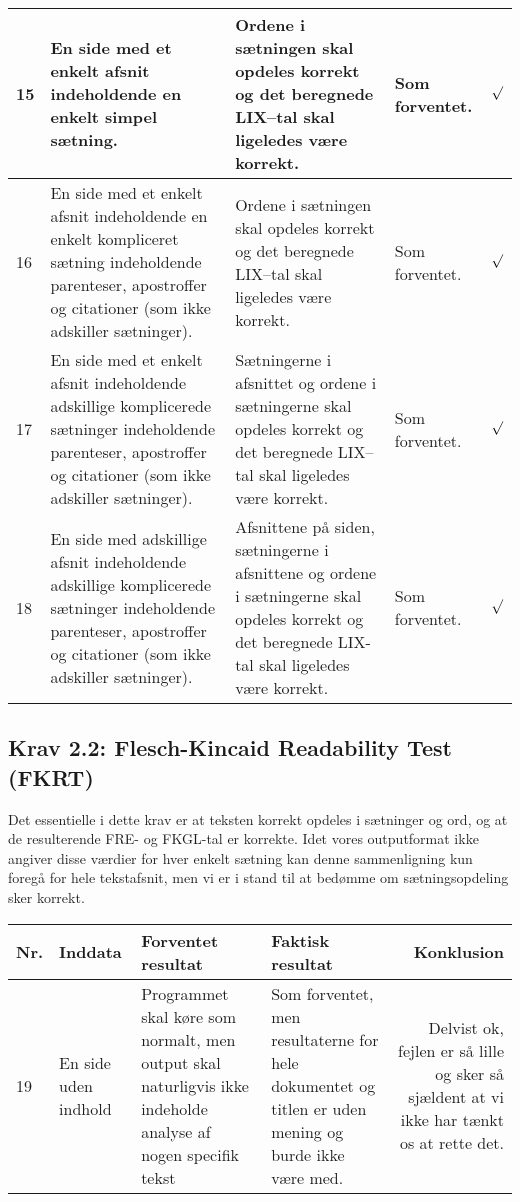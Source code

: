 \documentclass[a4paper,oneside,article]{memoir}
\begin{document}
\begin{landscape}
\begin{longtable}[c]{p{20pt}|p{220pt}|p{130pt}|p{130pt}|r}
15 & 
En side med et enkelt afsnit indeholdende en enkelt simpel sætning. &
Ordene i sætningen skal opdeles korrekt og det beregnede LIX--tal skal
ligeledes være korrekt. &
Som forventet. &
$\surd$ \\ \hline

16 & 
En side med et enkelt afsnit indeholdende en enkelt kompliceret
sætning indeholdende parenteser, apostroffer og citationer (som ikke
adskiller sætninger). &
Ordene i sætningen skal opdeles korrekt og det beregnede LIX--tal skal
ligeledes være korrekt. &
Som forventet. &
$\surd$ \\ \hline

17 &
En side med et enkelt afsnit indeholdende adskillige
komplicerede sætninger indeholdende parenteser, apostroffer og
citationer (som ikke adskiller sætninger). &
Sætningerne i afsnittet og ordene i sætningerne skal opdeles korrekt
og det beregnede LIX--tal skal ligeledes være korrekt. &
Som forventet. &
$\surd$ \\ \hline

18 &
En side med adskillige afsnit indeholdende adskillige
komplicerede sætninger indeholdende parenteser, apostroffer og
citationer (som ikke adskiller sætninger). &
Afsnittene på siden, sætningerne i afsnittene og ordene i sætningerne
skal opdeles korrekt og det beregnede LIX-tal skal ligeledes være korrekt. &
Som forventet. &
$\surd$ \\ \hline

\end{longtable}

\subsection{Krav 2.2: Flesch-Kincaid Readability Test (FKRT)}
Det essentielle i dette krav er at teksten korrekt opdeles i sætninger
og ord, og at de resulterende FRE- og FKGL-tal er korrekte. Idet vores
outputformat ikke angiver disse værdier for hver enkelt sætning kan
denne sammenligning kun foregå for hele tekstafsnit, men vi er i stand
til at bedømme om sætningsopdeling sker korrekt.

\begin{longtable}[c]{p{20pt}|p{220pt}|p{130pt}|p{130pt}|r}
\textbf{Nr.} &
\textbf{Inddata} &
\textbf{Forventet resultat} &
\textbf{Faktisk resultat} &
\textbf{Konklusion} \\ \hline

19 &
En side uden indhold &
Programmet skal køre som normalt, men output skal naturligvis ikke
indeholde analyse af nogen specifik tekst &
Som forventet, men resultaterne for hele dokumentet og titlen er uden
mening og burde ikke være med. &
Delvist ok, fejlen er så lille og sker så sjældent at vi ikke har
tænkt os at rette det. \\ \hline


\end{longtable}
\end{landscape}
\end{document}
